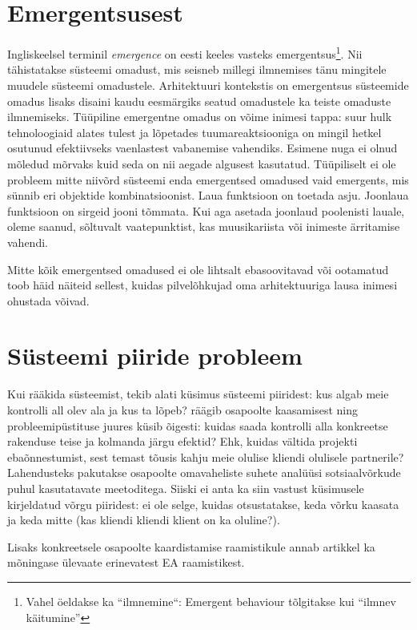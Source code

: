 \documentclass{tufte-book}
\begin{document}
\section{Emergentsusest}
Ingliskeelsel terminil \emph{emergence} on eesti keeles vasteks emergentsus\footnote{Vahel öeldakse ka ``ilmnemine``: Emergent behaviour tõlgitakse kui \enquote{ilmnev käitumine}}. Nii tähistatakse süsteemi omadust, mis seisneb millegi ilmnemises tänu mingitele muudele süsteemi omadustele. Arhitektuuri kontekstis on emergentsus süsteemide omadus lisaks disaini kaudu eesmärgiks seatud omadustele ka teiste omaduste ilmnemiseks. Tüüpiline emergentne omadus on võime inimesi tappa: suur hulk tehnoloogiaid alates tulest ja lõpetades tuumareaktsiooniga on mingil hetkel osutunud efektiivseks vaenlastest vabanemise vahendiks. Esimene nuga ei olnud mõledud mõrvaks kuid seda on nii aegade algusest kasutatud. Tüüpiliselt ei ole probleem mitte niivõrd süsteemi enda emergentsed omadused vaid emergents, mis sünnib eri objektide kombinatsioonist. Laua funktsioon on toetada asju. Joonlaua funktsioon on sirgeid jooni tõmmata. Kui aga asetada joonlaud poolenisti lauale, oleme saanud, sõltuvalt vaatepunktist, kas muusikariista või inimeste ärritamise vahendi. 

Mitte kõik emergentsed omadused ei ole lihtsalt ebasoovitavad või ootamatud \cite{emergence} toob häid näiteid sellest, kuidas pilvelõhkujad oma arhitektuuriga lausa inimesi ohustada võivad.

\section{Süsteemi piiride probleem}
\label{sec:boundary}
Kui rääkida süsteemist, tekib alati küsimus süsteemi piiridest: kus algab meie kontrolli all olev ala ja kus ta lõpeb? \cite{wood2013framework} räägib osapoolte kaasamisest ning probleemipüstituse juures küsib õigesti: kuidas saada kontrolli alla konkreetse rakenduse teise ja kolmanda järgu efektid? Ehk, kuidas vältida projekti ebaõnnestumist, sest temast tõusis kahju meie olulise kliendi olulisele partnerile? Lahendusteks pakutakse osapoolte omavaheliste suhete analüüsi sotsiaalvõrkude puhul kasutatavate meetoditega. Siiski ei anta ka siin vastust küsimusele kirjeldatud võrgu piiridest: ei ole selge, kuidas otsustatakse, keda võrku kaasata ja keda mitte (kas kliendi kliendi klient on ka oluline?). 

Lisaks konkreetsele osapoolte kaardistamise raamistikule annab artikkel ka mõningase ülevaate erinevatest EA raamistikest.
\end{document}

